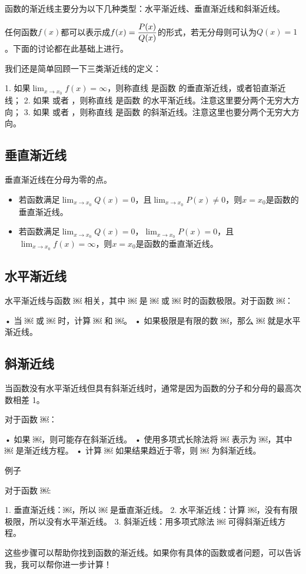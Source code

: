
函数的渐近线主要分为以下几种类型：水平渐近线、垂直渐近线和斜渐近线。

任何函数$f(x)$都可以表示成$\displaystyle f(x)={P(x)\over Q(x)}$的形式，若无分母则可认为$Q(x)=1$。下面的讨论都在此基础上进行。

我们还是简单回顾一下三类渐近线的定义：

1.  如果$\displaystyle \lim_{x\to x_0}f(x)=\infty$，则称直线 是函数 的垂直渐近线，或者铅直渐近线；
2.  如果 或者 ，则称直线 是函数 的水平渐近线。注意这里要分两个无穷大方向；
3.  如果 或者 ，则称直线 是函数 的斜渐近线。注意这里也要分两个无穷大方向。


\subsection{垂直渐近线}

垂直渐近线在分母为零的点。

\begin{itemize}
\item 若函数满足$\displaystyle\lim_{x\to x_0}Q(x)=0$，且$\displaystyle\lim_{x\to x_0}P(x)\neq0$，则$x=x_0$是函数的垂直渐近线。
\item 若函数满足$\displaystyle\lim_{x\to x_0}Q(x)=0$，$\displaystyle\lim_{x\to x_0}P(x)=0$，且$\displaystyle \lim_{x\to x_0}f(x)=\infty$，则$x=x_0$是函数的垂直渐近线。
\end{itemize}
\subsection{水平渐近线}

水平渐近线与函数 ￼ 相关，其中 ￼ 是 ￼ 或 ￼ 时的函数极限。对于函数 ￼：

	•	当 ￼ 或 ￼ 时，计算 ￼ 和 ￼。
	•	如果极限是有限的数 ￼，那么 ￼ 就是水平渐近线。

\subsection{斜渐近线}

当函数没有水平渐近线但具有斜渐近线时，通常是因为函数的分子和分母的最高次数相差 1。

对于函数 ￼：

	•	如果 ￼，则可能存在斜渐近线。
	•	使用多项式长除法将 ￼ 表示为 ￼，其中 ￼ 是渐近线方程。
	•	计算 ￼ 如果结果趋近于零，则 ￼ 为斜渐近线。

例子

对于函数 ￼:

	1.	垂直渐近线：￼，所以 ￼ 是垂直渐近线。
	2.	水平渐近线：计算 ￼，没有有限极限，所以没有水平渐近线。
	3.	斜渐近线：用多项式除法 ￼ 可得斜渐近线方程。

这些步骤可以帮助你找到函数的渐近线。如果你有具体的函数或者问题，可以告诉我，我可以帮你进一步计算！